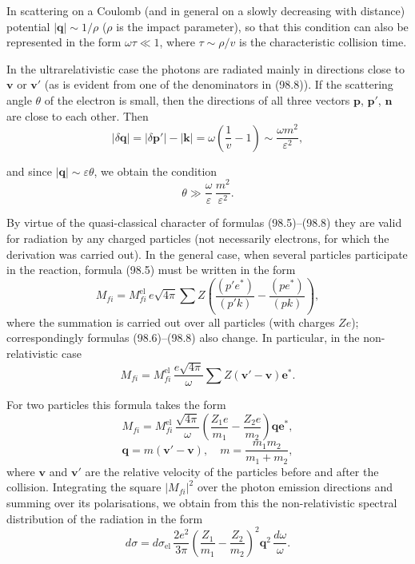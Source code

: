 In scattering on a Coulomb (and in general on a slowly decreasing with distance) potential $|\mathbf{q}| \sim 1/\rho$ ($\rho$ is the impact parameter), so that this condition can also be represented in the form $\omega\tau \ll 1$, where $\tau \sim \rho/v$ is the characteristic collision time.

In the ultrarelativistic case the photons are radiated mainly in directions close to $\mathbf{v}$ or $\mathbf{v}'$ (as is evident from one of the denominators in (98.8)). If the scattering angle $\theta$ of the electron is small, then the directions of all three vectors $\mathbf{p}$, $\mathbf{p}'$, $\mathbf{n}$ are close to each other. Then
\[
|\delta\mathbf{q}| = |\delta\mathbf{p}'| - |\mathbf{k}| = \omega\!\left(\frac{1}{v} - 1\right) \sim \frac{\omega m^2}{\varepsilon^2},
\]


and since $|\mathbf{q}| \sim \varepsilon\theta$, we obtain the condition
\begin{equation}
\theta \gg \frac{\omega}{\varepsilon}\,\frac{m^2}{\varepsilon^2}.
\label{eq:98.10}
\end{equation}

By virtue of the quasi-classical character of formulas (98.5)--(98.8) they are valid for radiation by any charged particles (not necessarily electrons, for which the derivation was carried out). In the general case, when several particles participate in the reaction, formula (98.5) must be written in the form
\begin{equation}
M_{fi} = M_{fi}^\text{el}\,e\sqrt{4\pi}\sum Z\!\left(\frac{(p'e^*)}{(p'k)} - \frac{(pe^*)}{(pk)}\right),
\label{eq:98.11}
\end{equation}
where the summation is carried out over all particles (with charges $Ze$); correspondingly formulas (98.6)--(98.8) also change. In particular, in the non-relativistic case
\begin{equation}
M_{fi} = M_{fi}^\text{el}\,\frac{e\sqrt{4\pi}}{\omega}\sum Z(\mathbf{v}' - \mathbf{v})\mathbf{e}^*.
\label{eq:98.12}
\end{equation}

For two particles this formula takes the form
\begin{equation}
M_{fi} = M_{fi}^\text{el}\,\frac{\sqrt{4\pi}}{\omega}\!\left(\frac{Z_1 e}{m_1} - \frac{Z_2 e}{m_2}\right)\mathbf{q}\mathbf{e}^*,
\label{eq:98.13}
\end{equation}
\[
\mathbf{q} = m(\mathbf{v}' - \mathbf{v}), \quad m = \frac{m_1 m_2}{m_1 + m_2},
\]
where $\mathbf{v}$ and $\mathbf{v}'$ are the relative velocity of the particles before and after the collision. Integrating the square $|M_{fi}|^2$ over the photon emission directions and summing over its polarisations, we obtain from this the non-relativistic spectral distribution of the radiation in the form
\[
d\sigma = d\sigma_\text{el}\,\frac{2e^2}{3\pi}\!\left(\frac{Z_1}{m_1} - \frac{Z_2}{m_2}\right)^{\!2}\mathbf{q}^2\,\frac{d\omega}{\omega}.
\]

